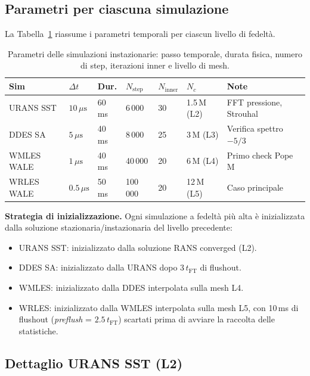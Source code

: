\documentclass[11pt,a4paper]{article}
\newcommand{\mus}{\,\mu\mathrm{s}}
\newcommand{\tFT}{t_{\mathrm{FT}}}
\begin{document}
\subsection{Parametri per ciascuna simulazione}

La Tabella~\ref{tab:simparams} riassume i parametri temporali per ciascun livello di fedeltà.

\begin{table}[H]
  \centering
  \caption{Parametri delle simulazioni instazionarie: passo temporale, durata fisica, numero di step, iterazioni inner e livello di mesh.}
  \label{tab:simparams}
  \begin{tabularx}{\textwidth}{lXXXXXX}
    \toprule
    \rowcolor{tablehead}
    \textbf{Sim} & $\Delta t$ & \textbf{Dur.} & $N_{\mathrm{step}}$ & $N_{\mathrm{inner}}$ & $N_c$ & \textbf{Note} \\
    \midrule
    URANS SST   & $10\mus$ & 60\,ms & 6\,000  & 30 & 1.5\,M (L2) & FFT pressione, Strouhal \\
    DDES SA     & $5\mus$  & 40\,ms & 8\,000  & 25 & 3\,M (L3)   & Verifica spettro $-5/3$ \\
    WMLES WALE  & $1\mus$  & 40\,ms & 40\,000 & 20 & 6\,M (L4)   & Primo check Pope M \\
    WRLES WALE  & $0.5\mus$& 50\,ms & 100\,000 & 20 & 12\,M (L5) & Caso principale \\
    \bottomrule
  \end{tabularx}
\end{table}

\textbf{Strategia di inizializzazione.} Ogni simulazione a fedeltà più alta è inizializzata dalla soluzione stazionaria/instazionaria del livello precedente:

\begin{itemize}
  \item URANS SST: inizializzato dalla soluzione RANS converged (L2).
  \item DDES SA: inizializzato dalla URANS dopo 3\,$\tFT$ di flushout.
  \item WMLES: inizializzato dalla DDES interpolata sulla mesh L4.
  \item WRLES: inizializzato dalla WMLES interpolata sulla mesh L5, con 10\,ms di flushout (\emph{preflush} = $2.5\,\tFT$) scartati prima di avviare la raccolta delle statistiche.
\end{itemize}

\subsection{Dettaglio URANS SST (L2)}
\end{document}
